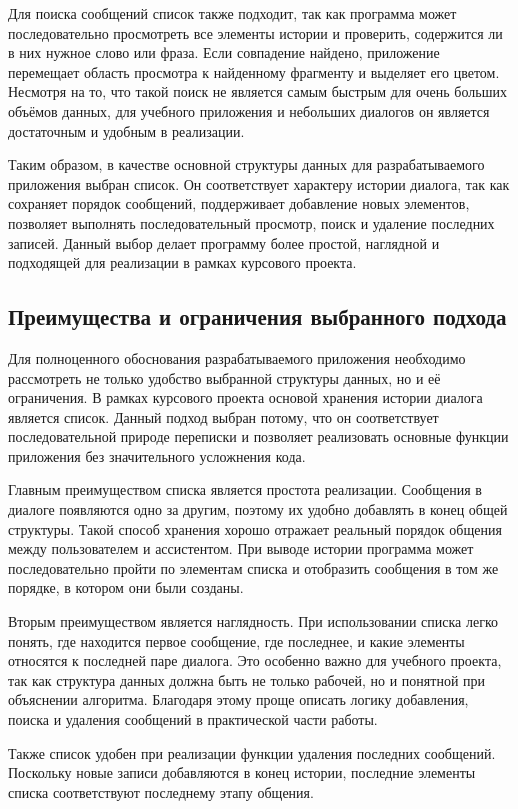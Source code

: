 \documentclass[12pt,a4paper]{article}
\begin{document}
Для поиска сообщений список также подходит, так как программа может последовательно просмотреть все элементы истории и проверить, содержится ли в них нужное слово или фраза. Если совпадение найдено, приложение перемещает область просмотра к найденному фрагменту и выделяет его цветом. Несмотря на то, что такой поиск не является самым быстрым для очень больших объёмов данных, для учебного приложения и небольших диалогов он является достаточным и удобным в реализации.

Таким образом, в качестве основной структуры данных для разрабатываемого приложения выбран список. Он соответствует характеру истории диалога, так как сохраняет порядок сообщений, поддерживает добавление новых элементов, позволяет выполнять последовательный просмотр, поиск и удаление последних записей. Данный выбор делает программу более простой, наглядной и подходящей для реализации в рамках курсового проекта.

\subsection{Преимущества и ограничения выбранного подхода}

Для полноценного обоснования разрабатываемого приложения необходимо рассмотреть не только удобство выбранной структуры данных, но и её ограничения. В рамках курсового проекта основой хранения истории диалога является список. Данный подход выбран потому, что он соответствует последовательной природе переписки и позволяет реализовать основные функции приложения без значительного усложнения кода.

Главным преимуществом списка является простота реализации. Сообщения в диалоге появляются одно за другим, поэтому их удобно добавлять в конец общей структуры. Такой способ хранения хорошо отражает реальный порядок общения между пользователем и ассистентом. При выводе истории программа может последовательно пройти по элементам списка и отобразить сообщения в том же порядке, в котором они были созданы.

Вторым преимуществом является наглядность. При использовании списка легко понять, где находится первое сообщение, где последнее, и какие элементы относятся к последней паре диалога. Это особенно важно для учебного проекта, так как структура данных должна быть не только рабочей, но и понятной при объяснении алгоритма. Благодаря этому проще описать логику добавления, поиска и удаления сообщений в практической части работы.

Также список удобен при реализации функции удаления последних сообщений. Поскольку новые записи добавляются в конец истории, последние элементы списка соответствуют последнему этапу общения.
\end{document}
